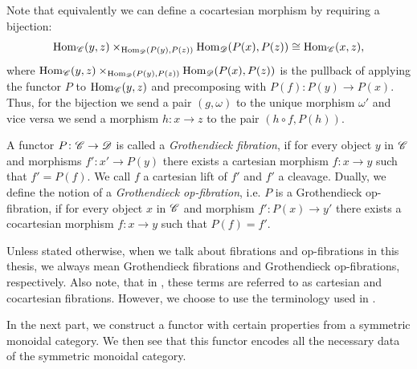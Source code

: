     Note that equivalently we can define a cocartesian morphism by requiring a
    bijection:
    \[
    \operatorname{Hom}_{\mathscr{C}}(y,z) \times_{\operatorname{Hom}_{\mathscr{D}}(P(y), P(z))} \operatorname{Hom}_{\mathscr{D}}(P(x), P(z)) \cong \operatorname{Hom}_{\mathscr{C}}(x,z),
    \]
    where $\operatorname{Hom}_{\mathscr{C}}(y,z) \times_{\operatorname{Hom}_{\mathscr{D}}(P(y), P(z))} \operatorname{Hom}_{\mathscr{D}}(P(x), P(z))$
    is the pullback of applying the functor $P$ to $\operatorname{Hom}_{\mathscr{C}}(y,z)$ and
    precomposing with $P(f) \colon P(y) \to P(x)$. Thus, for the bijection we
    send a pair $(g, \omega)$ to the unique morphism $\omega'$ and vice versa we
    send a morphism $h \colon x \to z$ to the pair $(h \circ f, P(h))$.

    \begin{defin}
        A functor $P \colon \mathscr{C} \to \mathscr{D}$ is called a {\em Grothendieck fibration},
        if for every object $y$ in $\mathscr{C}$ and morphisms $f' \colon x' \to P(y)$
        there exists a cartesian morphism $f \colon x \to y$ such that $f' =
        P(f)$. We call $f$ a cartesian lift of $f'$ and $f'$ a cleavage. Dually,
        we define the notion of a {\em Grothendieck op-fibration}, i.e. $P$ is a
        Grothendieck op-fibration, if for every object $x$ in $\mathscr{C}$ and morphism
        $f' \colon P(x) \to y'$ there exists a cocartesian morphism $f \colon x
        \to y$ such that $P(f)=f'$.
    \end{defin}

    Unless stated otherwise, when we talk about fibrations and op-fibrations in
    this thesis, we always mean Grothendieck fibrations and Grothendieck
    op-fibrations, respectively. Also note, that in
    \cite[\href{https://kerodon.net/tag/01RF}{Definition 01RF}]{kerodon}, these
    terms are referred to as cartesian and cocartesian fibrations. However, we
    choose to use the terminology used in \cite{ha}.
    
    In the next part, we construct a functor with certain properties from
    a symmetric monoidal category. We then see that this functor encodes all
    the necessary data of the symmetric monoidal category.

